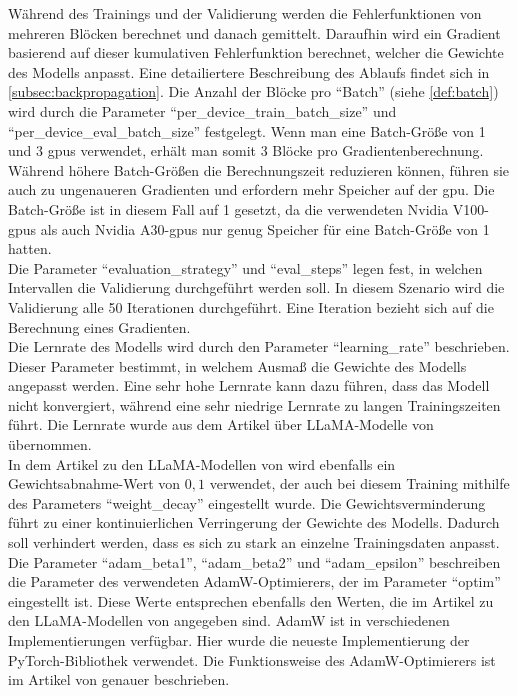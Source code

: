 Während des Trainings und der Validierung werden die Fehlerfunktionen von mehreren Blöcken berechnet und danach gemittelt.
Daraufhin wird ein Gradient basierend auf dieser kumulativen Fehlerfunktion berechnet, welcher die Gewichte des Modells anpasst.
Eine detailiertere Beschreibung des Ablaufs findet sich in \cref{subsec:backpropagation}.
Die Anzahl der Blöcke pro \enquote{Batch} (siehe \cref{def:batch}) wird durch die Parameter \enquote{per\_device\_train\_batch\_size} und \enquote{per\_device\_eval\_batch\_size} festgelegt.
Wenn man eine Batch-Größe von 1 und 3 \ac{gpu}s verwendet, erhält man somit 3 Blöcke pro Gradientenberechnung.
Während höhere Batch-Größen die Berechnungszeit reduzieren können, führen sie auch zu ungenaueren Gradienten und erfordern mehr Speicher auf der \ac{gpu}.
Die Batch-Größe ist in diesem Fall auf 1 gesetzt, da die verwendeten Nvidia V100-\ac{gpu}s als auch Nvidia A30-\ac{gpu}s nur genug Speicher für eine Batch-Größe von 1 hatten.\\

Die Parameter \enquote{evaluation\_strategy} und \enquote{eval\_steps} legen fest, in welchen Intervallen die Validierung durchgeführt werden soll.
In diesem Szenario wird die Validierung alle 50 Iterationen durchgeführt.
Eine Iteration bezieht sich auf die Berechnung eines Gradienten.\\

Die Lernrate des Modells wird durch den Parameter \enquote{learning\_rate} beschrieben.
Dieser Parameter bestimmt, in welchem Ausmaß die Gewichte des Modells angepasst werden.
Eine sehr hohe Lernrate kann dazu führen, dass das Modell nicht konvergiert, während eine sehr niedrige Lernrate zu langen Trainingszeiten führt.
Die Lernrate wurde aus dem Artikel über LLaMA-Modelle von \citet{llama} übernommen.\\

In dem Artikel zu den LLaMA-Modellen von \citet{llama} wird ebenfalls ein Gewichtsabnahme-Wert von $0,1$ verwendet, der auch bei diesem Training mithilfe des Parameters \enquote{weight\_decay} eingestellt wurde.
Die Gewichtsverminderung führt zu einer kontinuierlichen Verringerung der Gewichte des Modells. Dadurch soll verhindert werden, dass es sich zu stark an einzelne Trainingsdaten anpasst.\\

Die Parameter \enquote{adam\_beta1}, \enquote{adam\_beta2} und \enquote{adam\_epsilon} beschreiben die Parameter des verwendeten AdamW-Optimierers, der im Parameter \enquote{optim} eingestellt ist.
Diese Werte entsprechen ebenfalls den Werten, die im Artikel zu den LLaMA-Modellen von \citet{llama} angegeben sind.
AdamW ist in verschiedenen Implementierungen verfügbar. Hier wurde die neueste Implementierung der PyTorch-Bibliothek verwendet.
Die Funktionsweise des AdamW-Optimierers ist im Artikel von \citet{adamw} genauer beschrieben.\\

